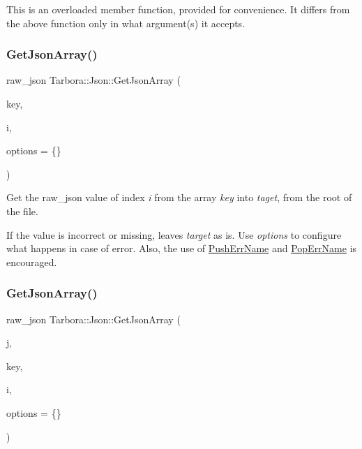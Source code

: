 This is an overloaded member function, provided for convenience. It differs from the above function only in what argument(s) it accepts. \mbox{\label{classTarbora_1_1Json_ab44082ff293945651c41ae82ee45a995}} 
\subsubsection{\texorpdfstring{Get\+Json\+Array()}{GetJsonArray()}\hspace{0.1cm}{\footnotesize\ttfamily [1/2]}}
{\footnotesize\ttfamily raw\+\_\+json Tarbora\+::\+Json\+::\+Get\+Json\+Array (\begin{DoxyParamCaption}\item[{const char $\ast$}]{key,  }\item[{int}]{i,  }\item[{\hyperlink{structTarbora_1_1JsonOptions}{Json\+Options}}]{options = {\ttfamily \{\}} }\end{DoxyParamCaption})}



Get the raw\+\_\+json value of index {\itshape i} from the array {\itshape key} into {\itshape taget}, from the root of the file. 

If the value is incorrect or missing, leaves {\itshape target} as is. Use {\itshape options} to configure what happens in case of error. Also, the use of \hyperlink{classTarbora_1_1Json_a061eac4f16dac3b9b3a26a66de0ea8f0}{Push\+Err\+Name} and \hyperlink{classTarbora_1_1Json_a14019f06d3bd76edd6a6e78134519d11}{Pop\+Err\+Name} is encouraged. \mbox{\label{classTarbora_1_1Json_ad96e1e105a7a043803895f8b0a7fa637}} 
\subsubsection{\texorpdfstring{Get\+Json\+Array()}{GetJsonArray()}\hspace{0.1cm}{\footnotesize\ttfamily [2/2]}}
{\footnotesize\ttfamily raw\+\_\+json Tarbora\+::\+Json\+::\+Get\+Json\+Array (\begin{DoxyParamCaption}\item[{raw\+\_\+json}]{j,  }\item[{const char $\ast$}]{key,  }\item[{int}]{i,  }\item[{\hyperlink{structTarbora_1_1JsonOptions}{Json\+Options}}]{options = {\ttfamily \{\}} }\end{DoxyParamCaption})}



